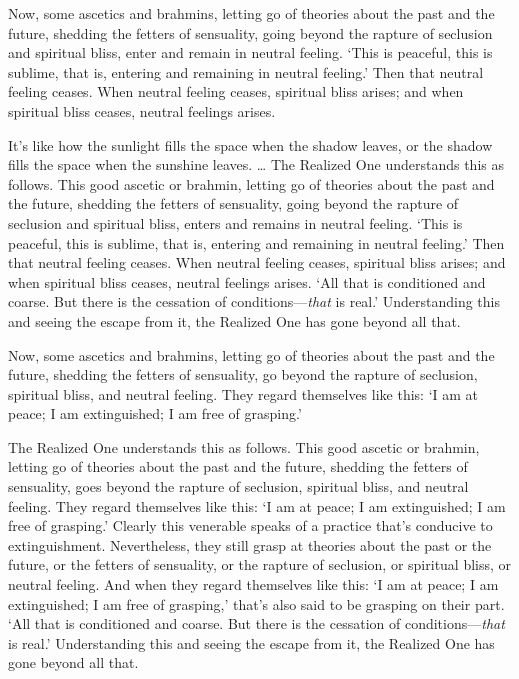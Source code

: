\documentclass[12pt,openany]{book}%
\begin{document}
Now, some ascetics and brahmins, letting go of theories about the past and the future, shedding the fetters of sensuality, going beyond the rapture of seclusion and spiritual bliss, enter and remain in neutral feeling. ‘This is peaceful, this is sublime, that is, entering and remaining in neutral feeling.’ Then that neutral feeling ceases. When neutral feeling ceases, spiritual bliss arises; and when spiritual bliss ceases, neutral feelings arises. 

It’s like how the sunlight fills the space when the shadow leaves, or the shadow fills the space when the sunshine leaves. … The Realized One understands this as follows. This good ascetic or brahmin, letting go of theories about the past and the future, shedding the fetters of sensuality, going beyond the rapture of seclusion and spiritual bliss, enters and remains in neutral feeling. ‘This is peaceful, this is sublime, that is, entering and remaining in neutral feeling.’ Then that neutral feeling ceases. When neutral feeling ceases, spiritual bliss arises; and when spiritual bliss ceases, neutral feelings arises. ‘All that is conditioned and coarse. But there is the cessation of conditions—\emph{that} is real.’ Understanding this and seeing the escape from it, the Realized One has gone beyond all that. 

Now, some ascetics and brahmins, letting go of theories about the past and the future, shedding the fetters of sensuality, go beyond the rapture of seclusion, spiritual bliss, and neutral feeling. They regard themselves like this: ‘I am at peace; I am extinguished; I am free of grasping.’ 

The Realized One understands this as follows. This good ascetic or brahmin, letting go of theories about the past and the future, shedding the fetters of sensuality, goes beyond the rapture of seclusion, spiritual bliss, and neutral feeling. They regard themselves like this: ‘I am at peace; I am extinguished; I am free of grasping.’ Clearly this venerable speaks of a practice that’s conducive to extinguishment. Nevertheless, they still grasp at theories about the past or the future, or the fetters of sensuality, or the rapture of seclusion, or spiritual bliss, or neutral feeling. And when they regard themselves like this: ‘I am at peace; I am extinguished; I am free of grasping,’ that’s also said to be grasping on their part. ‘All that is conditioned and coarse. But there is the cessation of conditions—\emph{that} is real.’ Understanding this and seeing the escape from it, the Realized One has gone beyond all that. 
\end{document}
